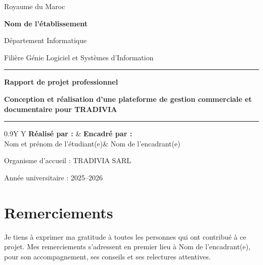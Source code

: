 \documentclass[12pt,a4paper,oneside]{report}
\newcommand{\Etablissement}{Nom de l'établissement}
\newcommand{\Departement}{Département Informatique}
\newcommand{\Filiere}{Filière Génie Logiciel et Systèmes d'Information}
\newcommand{\Auteur}{Nom et prénom de l'étudiant(e)}
\newcommand{\Encadrant}{Nom de l'encadrant(e)}
\newcommand{\AnneeUniversitaire}{2025--2026}
\newcommand{\Entreprise}{TRADIVIA SARL}
\newcommand{\TitreProjet}{Conception et réalisation d'une plateforme de gestion commerciale et documentaire pour TRADIVIA}
\begin{document}
\begin{titlepage}
\begin{center}
{\large Royaume du Maroc}\par
\vspace{0.3cm}
{\Large\bfseries \Etablissement}\par
{\large \Departement}\par
{\large \Filiere}\par
\vspace{1.2cm}
\textcolor{tradiviablue}{\rule{\textwidth}{1.2pt}}\par
\vspace{0.6cm}
{\LARGE\bfseries Rapport de projet professionnel}\par
\vspace{0.7cm}
{\Huge\bfseries\color{tradiviablue}\TitreProjet}\par
\vspace{0.5cm}
\textcolor{tradiviagold}{\rule{0.75\textwidth}{2pt}}\par
\vfill
\begin{tabularx}{0.9\textwidth}{Y Y}
\textbf{Réalisé par :} & \textbf{Encadré par :}\\[0.3cm]
\Auteur & \Encadrant\\
\end{tabularx}
\vfill
{\large Organisme d'accueil : \Entreprise}\par
\vspace{0.25cm}
{\large Année universitaire : \AnneeUniversitaire}
\end{center}
\end{titlepage}

\setcounter{page}{2}

\chapter*{Remerciements}
Je tiens à exprimer ma gratitude à toutes les personnes qui ont contribué à ce projet. Mes remerciements s'adressent en premier lieu à \Encadrant, pour son accompagnement, ses conseils et ses relectures attentives.
\end{document}
